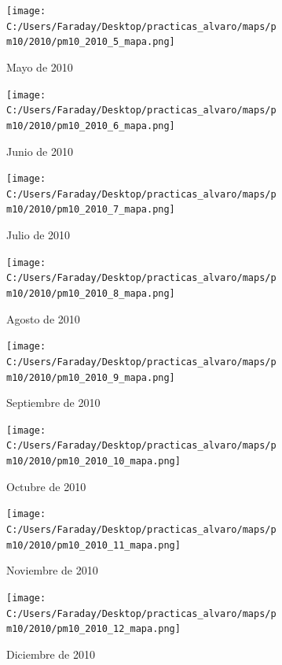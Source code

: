 \documentclass[12pt]{article}
\begin{document}
\begin{figure}[H]
\centering
\begin{subfigure}[h]{0.45\textwidth}
\texttt{[image: C:/Users/Faraday/Desktop/practicas\_alvaro/maps/pm10/2010/pm10\_2010\_5\_mapa.png]}
\caption{Mayo de 2010}
\label{fig:map-mon-3-5-2010}
\end{subfigure}
%
\begin{subfigure}[H]{0.45\textwidth}
\texttt{[image: C:/Users/Faraday/Desktop/practicas\_alvaro/maps/pm10/2010/pm10\_2010\_6\_mapa.png]}
\caption{Junio de 2010}
\label{fig:map-mon-3-6-2010}
\end{subfigure}
\caption{}
\end{figure}

\newpage

\begin{figure}[H]
\centering
\begin{subfigure}[h]{0.45\textwidth}
\texttt{[image: C:/Users/Faraday/Desktop/practicas\_alvaro/maps/pm10/2010/pm10\_2010\_7\_mapa.png]}
\caption{Julio de 2010}
\label{fig:map-mon-3-7-2010}
\end{subfigure}
%
\begin{subfigure}[H]{0.45\textwidth}
\texttt{[image: C:/Users/Faraday/Desktop/practicas\_alvaro/maps/pm10/2010/pm10\_2010\_8\_mapa.png]}
\caption{Agosto de 2010}
\label{fig:map-mon-3-8-2010}
\end{subfigure}
\caption{}
\end{figure}

\begin{figure}[H]
\centering
\begin{subfigure}[h]{0.45\textwidth}
\texttt{[image: C:/Users/Faraday/Desktop/practicas\_alvaro/maps/pm10/2010/pm10\_2010\_9\_mapa.png]}
\caption{Septiembre de 2010}
\label{fig:map-mon-3-9-2010}
\end{subfigure}
%
\begin{subfigure}[H]{0.45\textwidth}
\texttt{[image: C:/Users/Faraday/Desktop/practicas\_alvaro/maps/pm10/2010/pm10\_2010\_10\_mapa.png]}
\caption{Octubre de 2010}
\label{fig:map-mon-3-10-2010}
\end{subfigure}
\caption{}
\end{figure}

\begin{figure}[H]
\centering
\begin{subfigure}[h]{0.45\textwidth}
\texttt{[image: C:/Users/Faraday/Desktop/practicas\_alvaro/maps/pm10/2010/pm10\_2010\_11\_mapa.png]}
\caption{Noviembre de 2010}
\label{fig:map-mon-3-11-2010}
\end{subfigure}
%
\begin{subfigure}[H]{0.45\textwidth}
\texttt{[image: C:/Users/Faraday/Desktop/practicas\_alvaro/maps/pm10/2010/pm10\_2010\_12\_mapa.png]}
\caption{Diciembre de 2010}
\label{fig:map-mon-3-12-2010}
\end{subfigure}
\caption{}
\end{figure}
\end{document}
